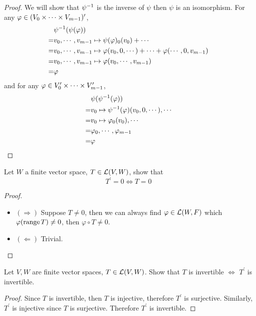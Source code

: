 \documentclass[../main.tex]{subfiles}
\begin{document}
\begin{proof}
  We will show that $\psi^{-1}$ is the inverse of $\psi$ then $\psi$ is an isomorphism.
  For any $\varphi \in (V_0 \times \cdots \times V_{m - 1})^\prime$,
  \begin{align*}
    & \psi^{-1}(\psi(\varphi))\\
   =& v_0 , \cdots , v_{m - 1} \mapsto \psi(\varphi)_0(v_0) + \cdots \\
   =& v_0 , \cdots , v_{m - 1} \mapsto \varphi(v_0, 0, \cdots) + \cdots + \varphi(\cdots, 0, v_{m - 1}) \\
   =& v_0 , \cdots , v_{m - 1} \mapsto \varphi(v_0 , \cdots , v_{m - 1}) \\
   =& \varphi
  \end{align*}
  and for any $\varphi \in V^\prime_0 \times \cdots \times V^\prime_{m - 1}$,
  \begin{align*}
     & \psi(\psi^{-1}(\varphi)) \\
    =& v_0 \mapsto \psi^{-1}(\varphi)(v_0, 0, \cdots), \cdots \\
    =& v_0 \mapsto \varphi_0(v_0) , \cdots \\
    =& \varphi_0 , \cdots , \varphi_{m - 1} \\
    =& \varphi
  \end{align*}
\end{proof}

\setcounter{exercise}{15}
\begin{exercise}
  Let $W$ a finite vector space, $T \in \mathcal{L}(V, W)$, show that
  \[
  T^\prime = 0 \iff T = 0
  \]
\end{exercise}
\begin{proof}
  ~
  \begin{itemize}
    \item $(\Rightarrow)$ Suppose $T \neq 0$, then we can always find $\varphi \in \mathcal{L}(W, F)$
          which $\varphi(\operatorname{range} T) \neq 0$, then $\varphi \circ T \neq 0$.
    \item $(\Leftarrow)$ Trivial.
  \end{itemize}
\end{proof}

\begin{exercise}
  Let $V, W$ are finite vector spaces, $T \in \mathcal{L}(V, W)$. Show that 
  $T$ is invertible $\iff$ $T^\prime$ is invertible.
\end{exercise}
\begin{proof}
  Since $T$ is invertible, then $T$ is injective, therefore $T^\prime$ is surjective.
  Similarly, $T^\prime$ is injective since $T$ is surjective.
  Therefore $T^\prime$ is invertible.
\end{proof}
\end{document}
